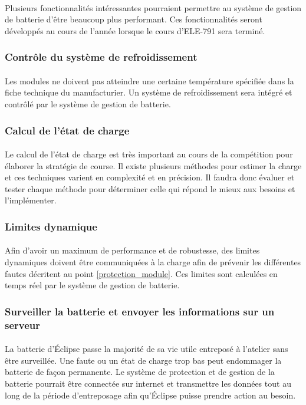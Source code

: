 	\paragraph{}
	Plusieurs fonctionnalités intéressantes pourraient permettre au système de gestion de batterie d'être beaucoup plus performant. Ces fonctionnalités seront développés au cours de l'année lorsque le cours d'ELE-791 sera terminé. 
	
	\subsubsection{Contrôle du système de refroidissement}
	\paragraph{}
	Les modules ne doivent pas atteindre une certaine température spécifiée dans la fiche technique du manufacturier. Un système de refroidissement sera intégré et contrôlé par le système de gestion de batterie. 
	
	\subsubsection{Calcul de l'état de charge}
	\paragraph{}
	Le calcul de l'état de charge est très important au cours de la compétition pour élaborer la stratégie de course. Il existe plusieurs méthodes pour estimer la charge et ces techniques varient en complexité et en précision. Il faudra donc évaluer et tester chaque méthode pour déterminer celle qui répond le mieux aux besoins et l'implémenter. 
	
	\subsubsection{Limites dynamique}
	\paragraph{}
	Afin d'avoir un maximum de performance et de robustesse, des limites dynamiques doivent être communiquées à la charge afin de prévenir les différentes fautes décritent au point \ref{protection_module}. Ces limites sont calculées en temps réel par le système de gestion de batterie.
	
	\subsubsection{Surveiller la batterie et envoyer les informations sur un serveur}
	\paragraph{}
	La batterie d'Éclipse passe la majorité de sa vie utile entreposé à l'atelier sans être surveillée. Une faute ou un état de charge trop bas peut endommager la batterie de façon permanente. Le système de protection et de gestion de la batterie pourrait être connectée sur internet et transmettre les données tout au long de la période d'entreposage afin qu'Éclipse puisse prendre action au besoin.  